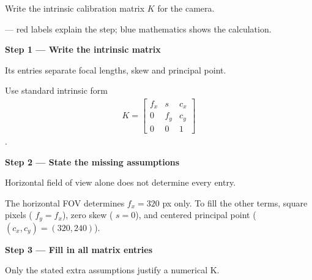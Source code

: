 \documentclass[letterpaper,11pt,english,openany,oneside]{jupyterBook}
\begin{document}
\sphinxAtStartPar
Write the intrinsic calibration matrix \(K\) for the camera.

\par\medskip

\sphinxAtStartPar
{} — red labels explain the step; blue mathematics shows the calculation.

\par\medskip{}
{\color{QuizStepRed}\bfseries Step 1 — Write the intrinsic matrix}\par\smallskip

\sphinxAtStartPar
{} Its entries separate focal lengths, skew and principal point.

\sphinxAtStartPar
Use standard intrinsic form
{\color{QuizMathBlue} \begin{equation*}
\begin{split}
K=\begin{bmatrix}f_x&s&c_x\\0&f_y&c_y\\0&0&1\end{bmatrix}
\end{split}
\end{equation*}}
\sphinxAtStartPar
.

\par

\par\medskip{}
{\color{QuizStepRed}\bfseries Step 2 — State the missing assumptions}\par\smallskip

\sphinxAtStartPar
{} Horizontal field of view alone does not determine every entry.

\sphinxAtStartPar
The horizontal FOV determines {\color{QuizMathBlue} \(f_x=320\)} px only. To fill the other terms,  square pixels ({\color{QuizMathBlue} \(f_y=f_x\)}), zero skew ({\color{QuizMathBlue} \(s=0\)}), and centered principal point ({\color{QuizMathBlue} \((c_x,c_y)=(320,240)\)}).

\par

\par\medskip{}
{\color{QuizStepRed}\bfseries Step 3 — Fill in all matrix entries}\par\smallskip

\sphinxAtStartPar
{} Only the stated extra assumptions justify a numerical K.
\end{document}
